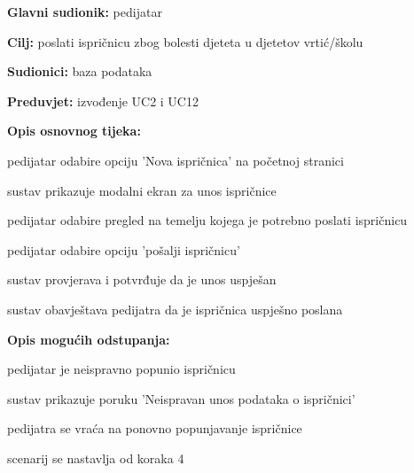                     \noindent {}
					\begin{packed_item}
	
						\item \textbf{Glavni sudionik: }pedijatar
						\item  \textbf{Cilj:} poslati ispričnicu zbog bolesti djeteta u djetetov vrtić/školu
						\item  \textbf{Sudionici:} baza podataka
						\item  \textbf{Preduvjet:} izvođenje UC2 i UC12
						\item  \textbf{Opis osnovnog tijeka:}
						
						\item[] \begin{packed_enum}
	
							\item pedijatar odabire opciju 'Nova ispričnica' na početnoj stranici
							\item sustav prikazuje modalni ekran za unos ispričnice
							\item pedijatar odabire pregled na temelju kojega je potrebno poslati ispričnicu
                            \item pedijatar odabire opciju 'pošalji ispričnicu'
                            \item sustav provjerava i potvrđuje da je unos uspješan
                            \item sustav obavještava pedijatra da je ispričnica uspješno poslana

						\end{packed_enum}
						
						\item  \textbf{Opis mogućih odstupanja:}
						
						\item[] \begin{packed_item}
	
                            \item[5.a] pedijatar je neispravno popunio ispričnicu
							\item[] \begin{packed_enum}
								\item sustav prikazuje poruku 'Neispravan unos podataka o ispričnici'
								\item pedijatra se vraća na ponovno popunjavanje ispričnice
								\item scenarij se nastavlja od koraka 4
							\end{packed_enum}
							
						\end{packed_item}
					\end{packed_item}

